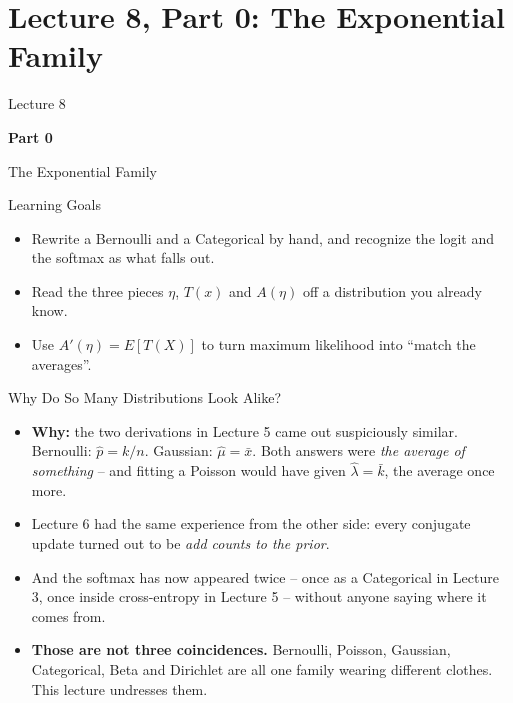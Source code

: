 \section{Lecture 8, Part 0: The Exponential Family}

\begin{frame}
\vfill
\centering
{\color{RLBlue}\large Lecture 8}

\vspace{0.3em}
{\color{RLBlue}\Large\bfseries Part 0}

\vspace{0.6em}
{\Large The Exponential Family}
\vfill
\end{frame}

\begin{frame}{Learning Goals}
\begin{itemize}
  \item Rewrite a Bernoulli and a Categorical by hand, and recognize the logit and the softmax as what falls out.
  \pause
  \item Read the three pieces $\eta$, $T(x)$ and $A(\eta)$ off a distribution you already know.
  \pause
  \item Use $A'(\eta) = E[T(X)]$ to turn maximum likelihood into ``match the averages''.
\end{itemize}
\end{frame}

\begin{frame}{Why Do So Many Distributions Look Alike?}
\begin{itemize}
  \item \textbf{Why:} the two derivations in Lecture 5 came out suspiciously similar. Bernoulli: $\hat{p} = k/n$. Gaussian: $\hat{\mu} = \bar{x}$. Both answers were \emph{the average of something} -- and fitting a Poisson would have given $\hat{\lambda} = \bar{k}$, the average once more.
  \pause
  \item Lecture 6 had the same experience from the other side: every conjugate update turned out to be \emph{add counts to the prior}.
  \pause
  \item And the softmax has now appeared twice -- once as a Categorical in Lecture 3, once inside cross-entropy in Lecture 5 -- without anyone saying where it comes from.
  \pause
  \item \textbf{Those are not three coincidences.} Bernoulli, Poisson, Gaussian, Categorical, Beta and Dirichlet are all one family wearing different clothes. This lecture undresses them.
\end{itemize}
\end{frame}

